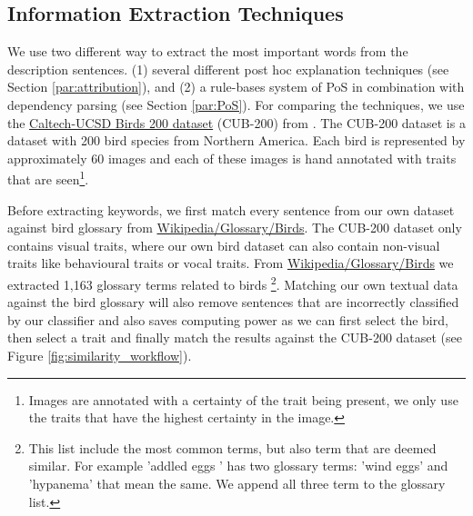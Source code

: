 \documentclass[a4paper, 12pt, oneside]{book} %
\begin{document}

\subsection{Information Extraction Techniques} \label{par:keywords}
We use two different way to extract the most important words from the description sentences.
(1) several different post hoc explanation techniques (see Section \ref{par:attribution}), and (2) a rule-bases system of PoS in combination with dependency parsing (see Section \ref{par:PoS}). 
For comparing the techniques, we use the \href{http://www.vision.caltech.edu/visipedia/CUB-200-2011.html}{Caltech-UCSD Birds 200 dataset} (CUB-200) from  \textcite{welinder_caltech-ucsd_2010}.
The CUB-200 dataset is a dataset with 200 bird species from Northern America.
Each bird is represented by approximately 60 images and each of these images is hand annotated with traits that are seen\footnote{Images are annotated with a certainty of the trait being present, we only use the traits that have the highest certainty in the image.}.

Before extracting keywords, we first match every sentence from our own dataset against bird glossary from \href{https://en.wikipedia.org/wiki/Glossary_of_bird_terms}{Wikipedia/Glossary/Birds}.
The CUB-200 dataset only contains visual traits, where our own bird dataset can also contain non-visual traits like behavioural traits or vocal traits.
From \href{https://en.wikipedia.org/wiki/Glossary_of_bird_terms}{Wikipedia/Glossary/Birds} we extracted 1,163 glossary terms related to birds \footnote{This list include the most common terms, but also term that are deemed similar. For example 'addled eggs ' has two glossary terms: 'wind eggs' and 'hypanema' that mean the same. We append all three term to the glossary list.}.
Matching our own textual data against the bird glossary will also remove sentences that are incorrectly classified by our classifier and also saves computing power as we can first select the bird, then select a trait and finally match the results against the CUB-200 dataset (see Figure \ref{fig:similarity_workflow}).
\end{document}
